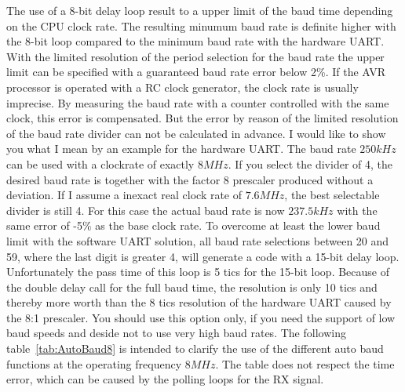 The use of a 8-bit delay loop result to a upper limit of the baud time
depending on the CPU clock rate.
The resulting minumum baud rate is definite higher with the 8-bit loop
compared to the minimum baud rate with the hardware UART.
With the limited resolution of the period selection for the baud rate
the upper limit can be specified with a guaranteed baud rate error below 2\%.
If the AVR processor is operated with a RC clock generator, the clock rate
is usually imprecise. By measuring the baud rate with a counter controlled
with the same clock, this error is compensated.
But the error by reason of the limited resolution of the baud rate divider 
can not be calculated in advance.
I would like to show you what I mean by an example for the hardware UART. 
The baud rate \(250kHz\) can be used with a clockrate of exactly \(8MHz\).
If you select the divider of 4, the desired baud rate is together with
the factor 8 prescaler produced without a deviation.
If I assume a inexact real clock rate of \(7.6MHz\),
the best selectable divider is still 4.
For this case the actual baud rate is now \(237.5kHz\) with the same
error of -5\% as the base clock rate.
To overcome at least the lower baud limit with the software UART solution,
all baud rate selections between 20 and 59, where the last digit is greater 4,
will generate a code with a 15-bit delay loop.
Unfortunately the pass time of this loop is 5 tics for the 15-bit loop.
Because of the double delay call for the full baud time,
the resolution is only 10 tics and thereby more worth than the 
8 tics resolution of the hardware UART caused by the 8:1 prescaler.
You should use this option only, if you need the support of low baud speeds
and deside not to use very high baud rates.
The following table~\ref{tab:AutoBaud8} is intended to clarify the use of
the different auto baud functions at the operating frequency \(8MHz\).
The table does not respect the time error, which can be caused by the
polling loops for the RX signal.

